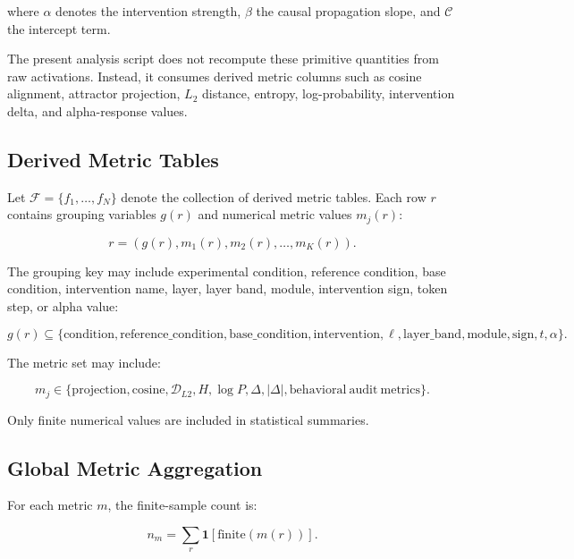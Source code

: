 where $\alpha$ denotes the intervention strength, $\beta$ the causal propagation slope, and $\mathcal{C}$ the intercept term.

The present analysis script does not recompute these primitive quantities from raw activations. 
Instead, it consumes derived metric columns such as cosine alignment, attractor projection, $L_2$ distance, entropy, log-probability, intervention delta, and alpha-response values.

\subsection{Derived Metric Tables}
\label{subsec:derived_tables}

Let $\mathcal{F} = \{f_1,\ldots,f_N\}$ denote the collection of derived metric tables. 
Each row $r$ contains grouping variables $g(r)$ and numerical metric values $m_j(r)$:

\begin{equation}
r
=
\left(
g(r),
m_1(r),
m_2(r),
\ldots,
m_K(r)
\right).
\end{equation}

The grouping key may include experimental condition, reference condition, base condition, intervention name, layer, layer band, module, intervention sign, token step, or alpha value:

\begin{equation}
g(r)
\subseteq
\{
\mathrm{condition},
\mathrm{reference\_condition},
\mathrm{base\_condition},
\mathrm{intervention},
\ell,
\mathrm{layer\_band},
\mathrm{module},
\mathrm{sign},
t,
\alpha
\}.
\end{equation}

The metric set may include:

\begin{equation}
m_j
\in
\{
\mathrm{projection},
\mathrm{cosine},
\mathcal{D}_{L2},
H,
\log P,
\Delta,
|\Delta|,
\mathrm{behavioral\ audit\ metrics}
\}.
\end{equation}

Only finite numerical values are included in statistical summaries.

\subsection{Global Metric Aggregation}
\label{subsec:global_aggregation}

For each metric $m$, the finite-sample count is:

\begin{equation}
n_m
=
\sum_{r}
\mathbf{1}
\left[
\mathrm{finite}
\left(
m(r)
\right)
\right].
\end{equation}

